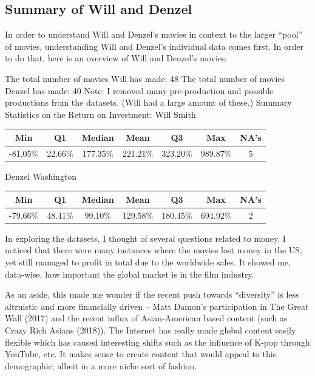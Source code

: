 \documentclass[]{article}
\begin{document}
\subsection{Summary of Will and Denzel}
\label{sec:data-sample}

In order to understand Will and Denzel's movies in context to the larger
\enquote{pool} of movies, understanding Will and Denzel's individual
data comes first. In order to do that, here is an overview of Will and
Denzel's movies:

The total number of movies Will has made: 48 The total number of movies
Denzel has made: 40 Note: I removed many pre-production and possible
productions from the datasets. (Will had a large amount of these.)
\vspace{5mm} Summary Statistics on the Return on Investment:
\vspace{5mm} Will Smith

\vspace{5mm}
\begin{tabular} {c c c c c c c}
  Min & Q1 & Median & Mean & Q3 & Max & NA's \\
  \hline
  -81.05\% & 22.66\% & 177.35\% & 221.21\% & 323.20\% & 989.87\% & 5
\end {tabular}
\vspace{5mm}

Denzel Washington

\vspace{5mm}
\begin{tabular}{c c c c c c c}
  Min & Q1 & Median & Mean & Q3 & Max & NA's \\
  \hline
  -79.66\% & 48.41\% & 99.10\% & 129.58\% & 180.45\% & 694.92\% & 2
\end{tabular}

\vspace{5mm}

In exploring the datasets, I thought of several questions related to
money. I noticed that there were many instances where the movies lost
money in the US, yet still managed to profit in total due to the
worldwide sales. It showed me, data-wise, how important the global
market is in the film industry.

As an aside, this made me wonder if the recent push towards
\enquote{diversity} is less altruistic and more financially driven --
Matt Damon's participation in The Great Wall (2017) and the recent
influx of Asian-American based content (such as Crazy Rich Asians
(2018)). The Internet has really made global content easily flexible
which has caused interesting shifts such as the influence of K-pop
through YouTube, etc. It makes sense to create content that would appeal
to this demographic, albeit in a more niche sort of fashion.
\vspace{5mm}
\end{document}
